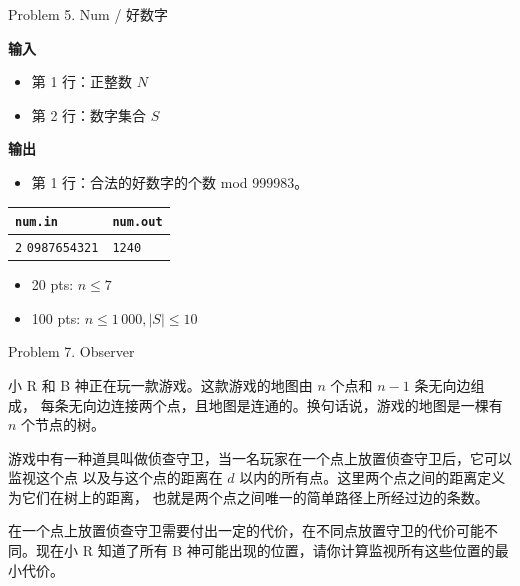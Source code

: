 \documentclass[UTF8]{beamer}
\begin{document}
\begin{frame}{Problem 5. Num / 好数字}

\textbf{输入}
\begin{itemize}
    \item 第 1 行：正整数 $N$
    \item 第 2 行：数字集合 $S$
\end{itemize}
\textbf{输出}
\begin{itemize}
    \item 第 1 行：合法的好数字的个数 mod 999983。
\end{itemize}

\begin{tabularx}{\textwidth}{|X|X|}
\hline
\texttt{\textbf{num.in}} & \texttt{\textbf{num.out}} \\ \hline
\texttt{2}\newline
\texttt{0987654321}
&
\texttt{1240}
\\ \hline
\end{tabularx}
\newline
\begin{itemize}
    \item 20 pts: $n \leq 7$
    \item 100 pts: $n \leq 1\,000, |S| \leq 10$
\end{itemize}

\end{frame}


\begin{frame}{Problem 7. Observer}

小 R 和 B 神正在玩一款游戏。这款游戏的地图由 $n$ 个点和 $n - 1$ 条无向边组成，
每条无向边连接两个点，且地图是连通的。换句话说，游戏的地图是一棵有 $n$ 个节点的树。

游戏中有一种道具叫做侦查守卫，当一名玩家在一个点上放置侦查守卫后，它可以监视这个点
以及与这个点的距离在 $d$ 以内的所有点。这里两个点之间的距离定义为它们在树上的距离，
也就是两个点之间唯一的简单路径上所经过边的条数。

在一个点上放置侦查守卫需要付出一定的代价，在不同点放置守卫的代价可能不同。现在小 R
知道了所有 B 神可能出现的位置，请你计算监视所有这些位置的最小代价。

\end{frame}
\end{document}
